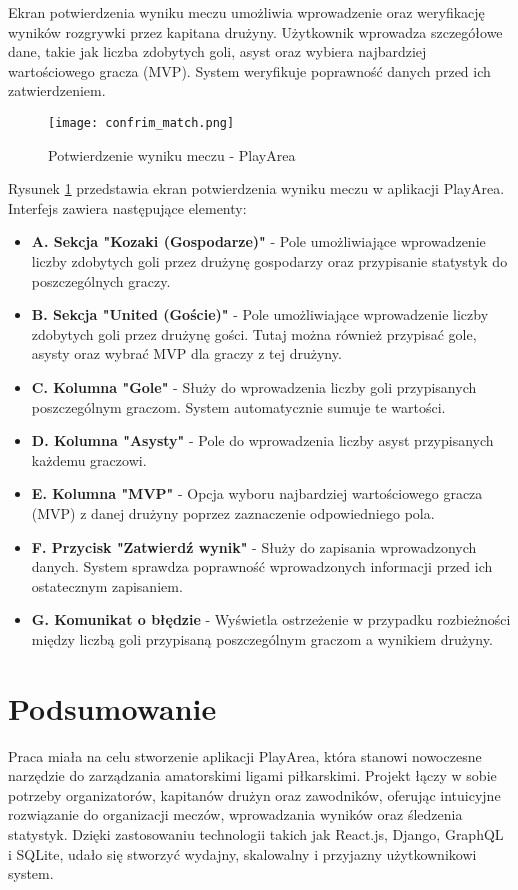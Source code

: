\documentclass[wmii,inf,inz]{uwmthesis} %
\begin{document}
Ekran potwierdzenia wyniku meczu umożliwia wprowadzenie oraz weryfikację wyników rozgrywki przez kapitana drużyny. Użytkownik wprowadza szczegółowe dane, takie jak liczba zdobytych goli, asyst oraz wybiera najbardziej wartościowego gracza (MVP). System weryfikuje poprawność danych przed ich zatwierdzeniem.

\begin{figure}[H]
    \centering
    \texttt{[image: confrim\_match.png]}
    \caption{Potwierdzenie wyniku meczu - PlayArea}
    \label{fig:confirm_match}
\end{figure}

\noindent
Rysunek \ref{fig:confirm_match} przedstawia ekran potwierdzenia wyniku meczu w aplikacji PlayArea. Interfejs zawiera następujące elementy:
\begin{itemize}
    \item \textbf{A. Sekcja "Kozaki (Gospodarze)"} - Pole umożliwiające wprowadzenie liczby zdobytych goli przez drużynę gospodarzy oraz przypisanie statystyk do poszczególnych graczy.
    \item \textbf{B. Sekcja "United (Goście)"} - Pole umożliwiające wprowadzenie liczby zdobytych goli przez drużynę gości. Tutaj można również przypisać gole, asysty oraz wybrać MVP dla graczy z tej drużyny.
    \item \textbf{C. Kolumna "Gole"} - Służy do wprowadzenia liczby goli przypisanych poszczególnym graczom. System automatycznie sumuje te wartości.
    \item \textbf{D. Kolumna "Asysty"} - Pole do wprowadzenia liczby asyst przypisanych każdemu graczowi.
    \item \textbf{E. Kolumna "MVP"} - Opcja wyboru najbardziej wartościowego gracza (MVP) z danej drużyny poprzez zaznaczenie odpowiedniego pola.
    \item \textbf{F. Przycisk "Zatwierdź wynik"} - Służy do zapisania wprowadzonych danych. System sprawdza poprawność wprowadzonych informacji przed ich ostatecznym zapisaniem.
    \item \textbf{G. Komunikat o błędzie} - Wyświetla ostrzeżenie w przypadku rozbieżności między liczbą goli przypisaną poszczególnym graczom a wynikiem drużyny.
\end{itemize}
\chapter{Podsumowanie}
Praca miała na celu stworzenie aplikacji PlayArea, która stanowi nowoczesne narzędzie do zarządzania amatorskimi ligami piłkarskimi. Projekt łączy w sobie potrzeby organizatorów, kapitanów drużyn oraz zawodników, oferując intuicyjne rozwiązanie do organizacji meczów, wprowadzania wyników oraz śledzenia statystyk. Dzięki zastosowaniu technologii takich jak React.js, Django, GraphQL i SQLite, udało się stworzyć wydajny, skalowalny i przyjazny użytkownikowi system.
\end{document}
